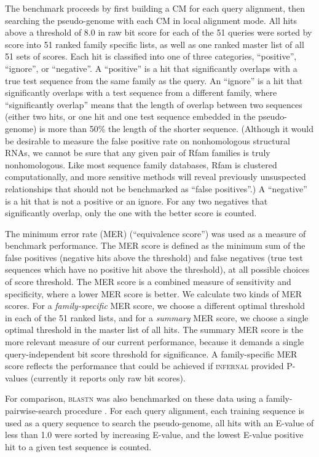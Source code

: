 \documentclass[11pt]{article}
\begin{document}
The benchmark proceeds by first building a CM for each query
alignment, then searching the pseudo-genome with each CM in local
alignment mode. All hits above a threshold of 8.0 in raw bit score for
each of the 51 queries were sorted by score into 51 ranked family
specific lists, as well as one ranked master list of all 51 sets of
scores.  Each hit is classified into one of three categories,
``positive'', ``ignore'', or ``negative''. A ``positive'' is a hit
that significantly overlaps with a true test sequence from the same
family as the query.  An ``ignore'' is a hit that significantly
overlaps with a test sequence from a different family, where
``significantly overlap'' means that the length of overlap between two
sequences (either two hits, or one hit and one test sequence embedded
in the pseudo-genome) is more than 50\% the length of the shorter
sequence.  (Although it would be desirable to measure the false
positive rate on nonhomologous structural RNAs, we cannot be sure that
any given pair of Rfam families is truly nonhomologous. Like most
sequence family databases, Rfam is clustered computationally, and more
sensitive methods will reveal previously unsuspected relationships
that should not be benchmarked as ``false positives''.)  A
``negative'' is a hit that is not a positive or an ignore. For any two
negatives that significantly overlap, only the one with the better
score is counted.

The minimum error rate (MER) (``equivalence score'') \cite{Pearson95}
was used as a measure of benchmark performance. The MER score is
defined as the minimum sum of the false positives (negative hits above
the threshold) and false negatives (true test sequences which have no
positive hit above the threshold), at all possible choices of score
threshold. The MER score is a combined measure of sensitivity and
specificity, where a lower MER score is better. We calculate two kinds
of MER scores. For a \emph{family-specific} MER score, we choose a
different optimal threshold in each of the 51 ranked lists, and for a
\emph{summary} MER score, we choose a single optimal threshold in the
master list of all hits. The summary MER score is the more relevant
measure of our current performance, because it demands a single
query-independent bit score threshold for significance. A
family-specific MER score reflects the performance that could be
achieved if \textsc{infernal} provided P-values (currently it reports
only raw bit scores).

For comparison, \textsc{blastn} was also benchmarked on these data
using a family-pairwise-search procedure \cite{Grundy98b}. For each
query alignment, each training sequence is used as a query sequence to
search the pseudo-genome, all hits with an E-value of less than 1.0
were sorted by increasing E-value, and the lowest E-value positive hit
to a given test sequence is counted.
\end{document}
